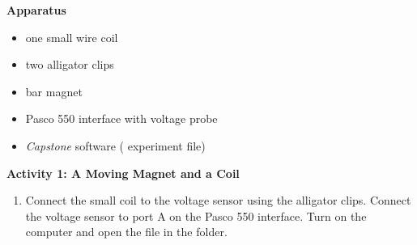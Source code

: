 \textbf{Apparatus}

\begin{itemize}[nosep]
\item one small wire coil
\item two alligator clips
\item bar magnet
\item Pasco 550 interface with voltage probe
\item \textit{Capstone} software ( experiment file)
\end{itemize}

\bigskip
\textbf{Activity 1: A Moving Magnet and a Coil}

\begin{enumerate}[labparts]
\setlength\rightmargin{3in}

\item Connect the small coil to the voltage sensor using the alligator clips.  Connect the voltage sensor to port A on the Pasco 550 interface.
Turn on the computer and open the file  in the \filename{\coursefolder} folder.

\end{enumerate}

\vspace{-0.3in}  

